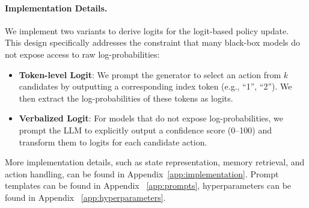 

\paragraph{Implementation Details.}
We implement two variants to derive logits for the logit-based policy update. This design specifically addresses the constraint that many black-box models do not expose access to raw log-probabilities:
\begin{itemize}[leftmargin=*,nosep]
    \item \textbf{Token-level Logit}: 
    We prompt the generator to select an action from $k$ candidates by outputting a corresponding index token (e.g., ``1'', ``2''). We then extract the log-probabilities of these tokens as logits.

    \item \textbf{Verbalized Logit}: 
    For models that do not expose log-probabilities, we prompt the LLM to explicitly output a confidence score (0--100) and transform them to logits for each candidate action.
\end{itemize}




More implementation details, such as state representation, memory retrieval, and action handling, can be found in Appendix~\ref{app:implementation}. Prompt templates can be found in Appendix ~\ref{app:prompts}, hyperparameters can be found in Appendix ~\ref{app:hyperparameters}. 


